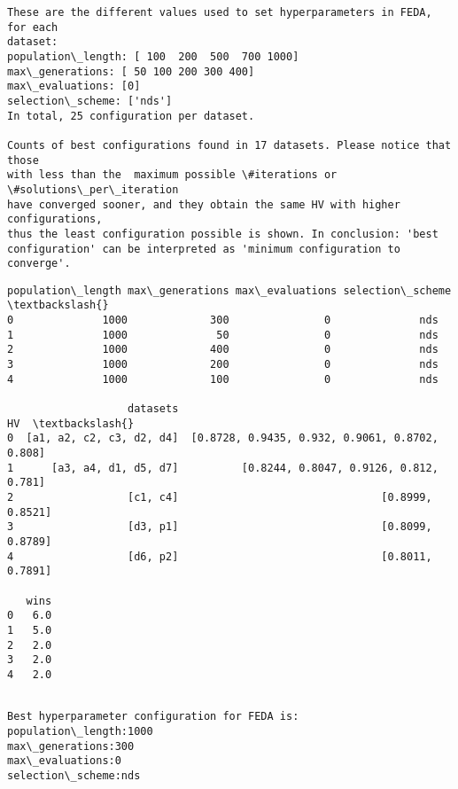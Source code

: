 \documentclass[11pt]{article}
\begin{document}
    \begin{Verbatim}[commandchars=\\\{\}]
These are the different values used to set hyperparameters in FEDA, for each
dataset:
population\_length: [ 100  200  500  700 1000]
max\_generations: [ 50 100 200 300 400]
max\_evaluations: [0]
selection\_scheme: ['nds']
In total, 25 configuration per dataset.

Counts of best configurations found in 17 datasets. Please notice that those
with less than the  maximum possible \#iterations or \#solutions\_per\_iteration
have converged sooner, and they obtain the same HV with higher configurations,
thus the least configuration possible is shown. In conclusion: 'best
configuration' can be interpreted as 'minimum configuration to converge'.
    \end{Verbatim}

    
    \begin{Verbatim}[commandchars=\\\{\}]
  population\_length max\_generations max\_evaluations selection\_scheme  \textbackslash{}
0              1000             300               0              nds   
1              1000              50               0              nds   
2              1000             400               0              nds   
3              1000             200               0              nds   
4              1000             100               0              nds   

                   datasets                                              HV  \textbackslash{}
0  [a1, a2, c2, c3, d2, d4]  [0.8728, 0.9435, 0.932, 0.9061, 0.8702, 0.808]   
1      [a3, a4, d1, d5, d7]          [0.8244, 0.8047, 0.9126, 0.812, 0.781]   
2                  [c1, c4]                                [0.8999, 0.8521]   
3                  [d3, p1]                                [0.8099, 0.8789]   
4                  [d6, p2]                                [0.8011, 0.7891]   

   wins  
0   6.0  
1   5.0  
2   2.0  
3   2.0  
4   2.0  
    \end{Verbatim}

    
    \begin{Verbatim}[commandchars=\\\{\}]

Best hyperparameter configuration for FEDA is:
population\_length:1000
max\_generations:300
max\_evaluations:0
selection\_scheme:nds
    \end{Verbatim}
\end{document}
